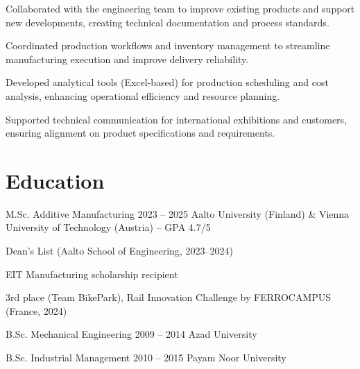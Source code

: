 \begin{cvitems}
  \item Collaborated with the engineering team to improve existing products and support new developments, creating technical documentation and process standards.
  \item Coordinated production workflows and inventory management to streamline manufacturing execution and improve delivery reliability.
  \item Developed analytical tools (Excel-based) for production scheduling and cost analysis, enhancing operational efficiency and resource planning.
  \item Supported technical communication for international exhibitions and customers, ensuring alignment on product specifications and requirements.
\end{cvitems}


\section{Education}

\ExperienceHeader
{M.Sc. Additive Manufacturing}
{2023 -- 2025}
{Aalto University (Finland) \& Vienna University of Technology (Austria) -- GPA 4.7/5}
\begin{cvitems}
  \item Dean’s List (Aalto School of Engineering, 2023--2024)
  \item EIT Manufacturing scholarship recipient
  \item 3rd place (Team BikePark), Rail Innovation Challenge by FERROCAMPUS (France, 2024)
\end{cvitems}

\ExperienceHeader
{B.Sc. Mechanical Engineering}
{2009 -- 2014}
{Azad University}

\ExperienceHeader
{B.Sc. Industrial Management}
{2010 -- 2015}
{Payam Noor University}